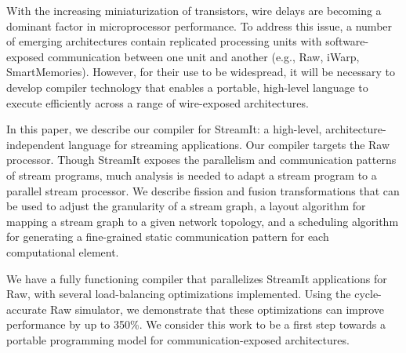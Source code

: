 With the increasing miniaturization of transistors, wire delays are
becoming a dominant factor in microprocessor performance.  To address
this issue, a number of emerging architectures contain replicated
processing units with software-exposed communication between one unit
and another (e.g., Raw, iWarp, SmartMemories).  However, for
their use to be widespread, it will be necessary to develop compiler
technology that enables a portable, high-level language to execute
efficiently across a range of wire-exposed architectures.

In this paper, we describe our compiler for StreamIt: a high-level,
architecture-independent language for streaming applications.  Our
compiler targets the Raw processor.  Though StreamIt exposes the
parallelism and communication patterns of stream programs, much
analysis is needed to adapt a stream program to a parallel stream
processor.  We describe fission and fusion transformations that can be
used to adjust the granularity of a stream graph, a layout algorithm
for mapping a stream graph to a given network topology, and a
scheduling algorithm for generating a fine-grained static
communication pattern for each computational element.

We have a fully functioning compiler that parallelizes StreamIt
applications for Raw, with several load-balancing optimizations
implemented.  Using the cycle-accurate Raw simulator, we demonstrate
that these optimizations can improve performance by up to 350\%.  We
consider this work to be a first step towards a portable programming
model for communication-exposed architectures.
